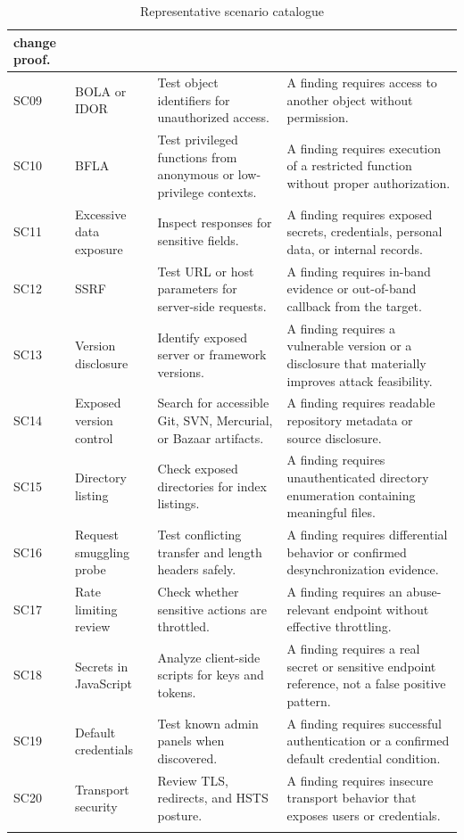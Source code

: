 \documentclass[12pt,a4paper]{report}
\begin{document}
\begin{longtable}{|p{}|p{}|p{}|p{}|}
change proof. \\
\hline
SC09 & BOLA or IDOR & Test object identifiers for unauthorized access. & A finding
requires access to another object without permission. \\
\hline
SC10 & BFLA & Test privileged functions from anonymous or low-privilege contexts. & A
finding requires execution of a restricted function without proper authorization. \\
\hline
SC11 & Excessive data exposure & Inspect responses for sensitive fields. & A finding
requires exposed secrets, credentials, personal data, or internal records. \\
\hline
SC12 & SSRF & Test URL or host parameters for server-side requests. & A finding requires
in-band evidence or out-of-band callback from the target. \\
\hline
SC13 & Version disclosure & Identify exposed server or framework versions. & A finding
requires a vulnerable version or a disclosure that materially improves attack
feasibility. \\
\hline
SC14 & Exposed version control & Search for accessible Git, SVN, Mercurial, or Bazaar
artifacts. & A finding requires readable repository metadata or source disclosure. \\
\hline
SC15 & Directory listing & Check exposed directories for index listings. & A finding
requires unauthenticated directory enumeration containing meaningful files. \\
\hline
SC16 & Request smuggling probe & Test conflicting transfer and length headers safely. &
A finding requires differential behavior or confirmed desynchronization evidence. \\
\hline
SC17 & Rate limiting review & Check whether sensitive actions are throttled. & A finding
requires an abuse-relevant endpoint without effective throttling. \\
\hline
SC18 & Secrets in JavaScript & Analyze client-side scripts for keys and tokens. & A
finding requires a real secret or sensitive endpoint reference, not a false positive
pattern. \\
\hline
SC19 & Default credentials & Test known admin panels when discovered. & A finding
requires successful authentication or a confirmed default credential condition. \\
\hline
SC20 & Transport security & Review TLS, redirects, and HSTS posture. & A finding
requires insecure transport behavior that exposes users or credentials. \\
\hline
\caption{Representative scenario catalogue}
\label{tab:scenario_catalogue}
\end{longtable}
\end{document}
